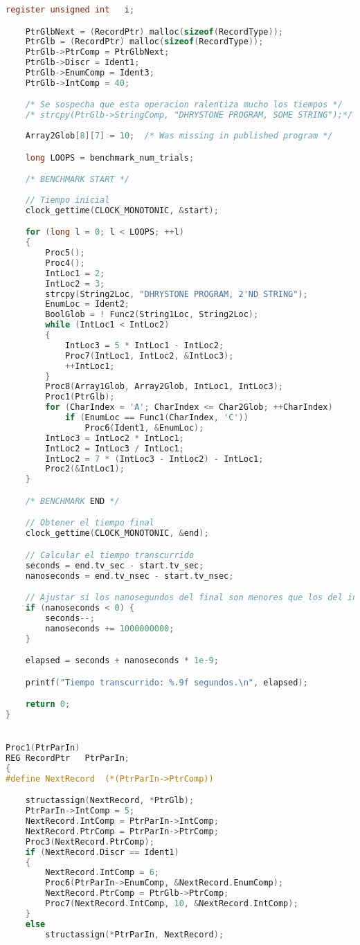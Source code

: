 \begin{lstlisting}[language=C,frame=single,showstringspaces=false,caption={Código fuente del benchmark Dhrystone},label=lst:dhrystone-benchmark]
	register unsigned int	i;

	PtrGlbNext = (RecordPtr) malloc(sizeof(RecordType));
	PtrGlb = (RecordPtr) malloc(sizeof(RecordType));
	PtrGlb->PtrComp = PtrGlbNext;
	PtrGlb->Discr = Ident1;
	PtrGlb->EnumComp = Ident3;
	PtrGlb->IntComp = 40;

	/* Se sospecha que esta operacion ralentiza mucho los tiempos */
	/* strcpy(PtrGlb->StringComp, "DHRYSTONE PROGRAM, SOME STRING");*/
	
	Array2Glob[8][7] = 10;	/* Was missing in published program */

	long LOOPS = benchmark_num_trials;

	/* BENCHMARK START */
	
	// Tiempo inicial
    clock_gettime(CLOCK_MONOTONIC, &start);

	for (long l = 0; l < LOOPS; ++l)
	{
		Proc5();
		Proc4();
		IntLoc1 = 2;
		IntLoc2 = 3;
		strcpy(String2Loc, "DHRYSTONE PROGRAM, 2'ND STRING");
		EnumLoc = Ident2;
		BoolGlob = ! Func2(String1Loc, String2Loc);
		while (IntLoc1 < IntLoc2)
		{
			IntLoc3 = 5 * IntLoc1 - IntLoc2;
			Proc7(IntLoc1, IntLoc2, &IntLoc3);
			++IntLoc1;
		}
		Proc8(Array1Glob, Array2Glob, IntLoc1, IntLoc3);
		Proc1(PtrGlb);
		for (CharIndex = 'A'; CharIndex <= Char2Glob; ++CharIndex)
			if (EnumLoc == Func1(CharIndex, 'C'))
				Proc6(Ident1, &EnumLoc);
		IntLoc3 = IntLoc2 * IntLoc1;
		IntLoc2 = IntLoc3 / IntLoc1;
		IntLoc2 = 7 * (IntLoc3 - IntLoc2) - IntLoc1;
		Proc2(&IntLoc1);
	}

	/* BENCHMARK END */

	// Obtener el tiempo final
    clock_gettime(CLOCK_MONOTONIC, &end);

	// Calcular el tiempo transcurrido
    seconds = end.tv_sec - start.tv_sec;
    nanoseconds = end.tv_nsec - start.tv_nsec;

    // Ajustar si los nanosegundos del final son menores que los del inicio
    if (nanoseconds < 0) {
        seconds--;
        nanoseconds += 1000000000;
    }

    elapsed = seconds + nanoseconds * 1e-9;

    printf("Tiempo transcurrido: %.9f segundos.\n", elapsed);

	return 0;
}


Proc1(PtrParIn)
REG RecordPtr	PtrParIn;
{
#define	NextRecord	(*(PtrParIn->PtrComp))

	structassign(NextRecord, *PtrGlb);
	PtrParIn->IntComp = 5;
	NextRecord.IntComp = PtrParIn->IntComp;
	NextRecord.PtrComp = PtrParIn->PtrComp;
	Proc3(NextRecord.PtrComp);
	if (NextRecord.Discr == Ident1)
	{
		NextRecord.IntComp = 6;
		Proc6(PtrParIn->EnumComp, &NextRecord.EnumComp);
		NextRecord.PtrComp = PtrGlb->PtrComp;
		Proc7(NextRecord.IntComp, 10, &NextRecord.IntComp);
	}
	else
		structassign(*PtrParIn, NextRecord);


\end{lstlisting}
